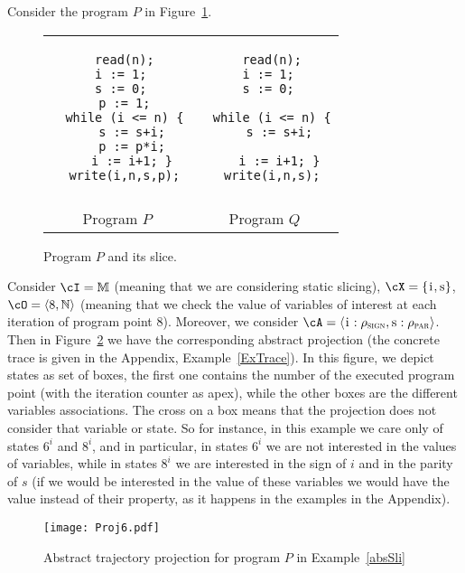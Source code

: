 \documentclass[prodmode,acmtocl]{acmsmall}
\newcommand{\caX}{\cX}
\def\prog{\ensuremath{P}\xspace}
\def\progq{\ensuremath{Q}\xspace}
\def\uco{\ensuremath{\rho}\xspace}
\def\tuple#1{\langle #1 \rangle}
\newcommand{\0}{\mbox{\bf 0}}
\newcommand{\tM}{\mathbb{M}}
\newcommand{\CODE}[1]{\ensuremath{\mbox{\lstinline!#1!}\xspace}\xspace}
\def\ii{\CODE{i}}
\def\ss{\CODE{s}}
\def\NATURALS{\mathbb{N}}
\def\PARDOM{\ensuremath{\uco_{\textsc{par}}}\xspace}
\def\SIGNDOM{\ensuremath{\uco_{\textsc{sign}}}\xspace}
\begin{document}
\begin{example}
  \label{absSli} Consider the program $\prog$ in
  Figure~\ref{fig:exsl}.
\begin{figure}
    \begin{center}
      {\small
        \begin{tabular}{c|c}
          \begin{lstlisting}
  read(n);
  i := 1; 
  s := 0; 
  p := 1;
  while (i <= n) {
    s := s+i;
    p := p*i;
    i := i+1; }
  write(i,n,s,p);
          \end{lstlisting} 
          &
          \begin{lstlisting}
  read(n);
  i := 1; 
  s := 0; 
  
  while (i <= n) {
    s := s+i;
    
    i := i+1; }
  write(i,n,s);
          \end{lstlisting} 
          \\
          &\\Program $\prog$ & Program $\progq$ 
      \end{tabular}}
    \end{center}
    
    \caption{Program $\prog$ and its slice.}\label{fig:exsl}
  \end{figure}  
  Consider $\cI=\tM$ (meaning that we are considering static slicing),
  $\caX=\{\ii,\ss\}$, $\cO=\tuple{8,\NATURALS}$ (meaning that we check
  the value of variables of interest at each iteration of program
  point $8$).  Moreover, we consider $\cA=\tuple{\mbox{\ii}:\SIGNDOM,
    \mbox{\ss}:\PARDOM}$.  Then in Figure~\ref{absFig} we have the
  corresponding abstract projection (the concrete trace is given in
  the Appendix, Example~\ref{ExTrace}).  In this figure, we depict
  states as set of boxes, the first one contains the number of the
  executed program point (with the iteration counter as apex), while
  the other boxes are the different variables associations. The cross
  on a box means that the projection does not consider that variable
  or state. So for instance, in this example we care only of states
  $6^i$ and $8^i$, and in particular, in states $6^i$ we are not
  interested in the values of variables, while in states $8^i$ we are
  interested in the sign of $i$ and in the parity of $s$ (if we would
  be interested in the value of these variables we would have the
  value instead of their property, as it happens in the examples in
  the Appendix).
  
  \begin{figure}
    \begin{center}
      \texttt{[image: Proj6.pdf]}
    \end{center}
    \caption{Abstract trajectory projection for program $\prog$ in
      Example~\ref{absSli}}
    \label{absFig}
  \end{figure}
\end{example}
\end{document}
